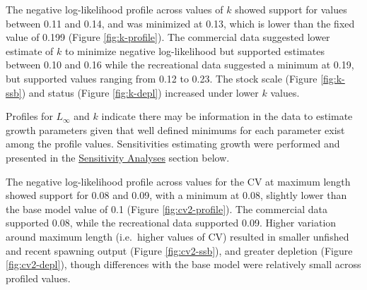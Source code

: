 \documentclass[11pt,
  english,
  a4paper,
]{article}
\begin{document}
\leavevmode\tagmcend\tagstructend\par


The negative log-likelihood profile across values of {\(k\)\leavevmode\tagmcend\tagstructend} showed support for values between 0.11 and 0.14, and was minimized at 0.13, which is lower than the fixed value of 0.199 (Figure \ref{fig:k-profile}). The commercial data suggested lower estimate of {\(k\)\leavevmode\tagmcend\tagstructend} to minimize negative log-likelihood but supported estimates between 0.10 and 0.16 while the recreational data suggested a minimum at 0.19, but supported values ranging from 0.12 to 0.23. The stock scale (Figure \ref{fig:k-ssb}) and status (Figure \ref{fig:k-depl}) increased under lower {\(k\)\leavevmode\tagmcend\tagstructend} values.

\leavevmode\tagmcend\tagstructend\par


Profiles for {\(L_{\infty}\)\leavevmode\tagmcend\tagstructend} and {\(k\)\leavevmode\tagmcend\tagstructend} indicate there may be information in the data to estimate growth parameters given that well defined minimums for each parameter exist among the profile values. Sensitivities estimating growth were performed and presented in the {\protect\hyperlink{sensitivity-analyses}{Sensitivity Analyses}\leavevmode\tagmcend\tagstructend} section below.

\leavevmode\tagmcend\tagstructend\par


The negative log-likelihood profile across values for the CV at maximum length showed support for 0.08 and 0.09, with a minimum at 0.08, slightly lower than the base model value of 0.1 (Figure \ref{fig:cv2-profile}). The commercial data supported 0.08, while the recreational data supported 0.09. Higher variation around maximum length (i.e.~higher values of CV) resulted in smaller unfished and recent spawning output (Figure \ref{fig:cv2-ssb}), and greater depletion (Figure \ref{fig:cv2-depl}), though differences with the base model were relatively small across profiled values.
\end{document}
